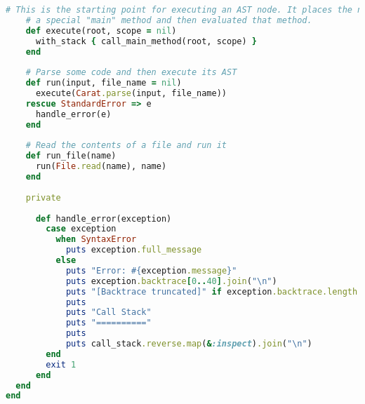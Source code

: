 \begin{lstlisting}[title={\small\ttfamily\bfseries runtime/runtime.rb},language=Ruby]
    # This is the starting point for executing an AST node. It places the node as the contents of
    # a special "main" method and then evaluated that method.
    def execute(root, scope = nil)
      with_stack { call_main_method(root, scope) }
    end
    
    # Parse some code and then execute its AST
    def run(input, file_name = nil)
      execute(Carat.parse(input, file_name))
    rescue StandardError => e
      handle_error(e)
    end
    
    # Read the contents of a file and run it
    def run_file(name)
      run(File.read(name), name)
    end
    
    private
      
      def handle_error(exception)
        case exception
          when SyntaxError
            puts exception.full_message
          else
            puts "Error: #{exception.message}"
            puts exception.backtrace[0..40].join("\n")
            puts "[Backtrace truncated]" if exception.backtrace.length > 40
            puts
            puts "Call Stack"
            puts "=========="
            puts
            puts call_stack.reverse.map(&:inspect).join("\n")
        end
        exit 1
      end
  end
end

\end{lstlisting}
